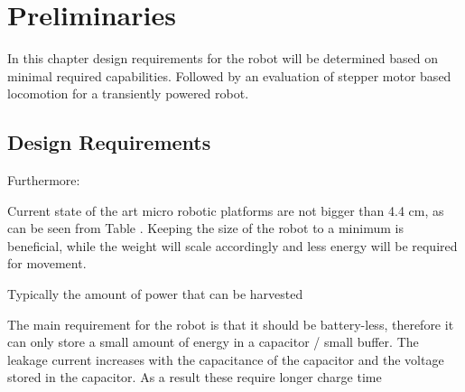 \chapter{Preliminaries}

In this chapter design requirements for the robot will be determined based on minimal required capabilities. 
Followed by an evaluation of stepper motor based locomotion for a transiently powered robot.

\section{Design Requirements}
\label{sec:design_requirements}






Furthermore:



Current state of the art micro robotic platforms are not bigger than 4.4 cm, as can be seen from Table \label{tab:comparison_robot_platforms}.
Keeping the size of the robot to a minimum is beneficial, while the weight will scale accordingly and less energy will be required for movement.



Typically the amount of power that can be harvested 

The main requirement for the robot is that it should be battery-less, therefore it can only store a small amount of energy in a capacitor / small buffer.
The leakage current increases with the capacitance of the capacitor and the voltage stored in the capacitor.
As a result these require longer charge time

